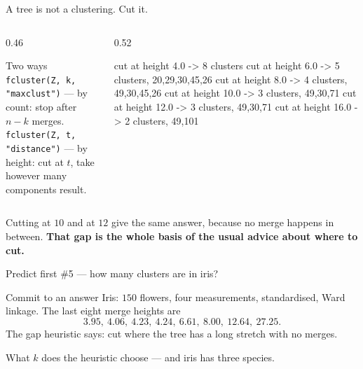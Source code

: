 \documentclass[aspectratio=169]{beamer}
\begin{document}
\begin{frame}[fragile,shrink=4]{A tree is not a clustering. Cut it.}
  \begin{columns}[T]
    \begin{column}{0.46\textwidth}
      \begin{block}{Two ways}
        \small
        \texttt{fcluster(Z, k, "maxclust")} --- by count: stop after $n-k$
        merges.\\[0.4em]
        \texttt{fcluster(Z, t, "distance")} --- by height: cut at $t$, take
        however many components result.
      \end{block}
    \end{column}
    \begin{column}{0.52\textwidth}
\begin{outblk}
  cut at height   4.0 -> 8 clusters
  cut at height   6.0 -> 5 clusters, 20,29,30,45,26
  cut at height   8.0 -> 4 clusters, 49,30,45,26
  cut at height  10.0 -> 3 clusters, 49,30,71
  cut at height  12.0 -> 3 clusters, 49,30,71
  cut at height  16.0 -> 2 clusters, 49,101
\end{outblk}
    \end{column}
  \end{columns}
  \vspace{0.3em}
  \begin{exampleblock}{}
    \centering
    Cutting at $10$ and at $12$ give the same answer, because no merge happens
    in between. \textbf{That gap is the whole basis of the usual advice about
    where to cut.}
  \end{exampleblock}
\end{frame}

\begin{frame}[shrink=9]{Predict first \#5 --- how many clusters are in iris?}
  \begin{alertblock}{Commit to an answer}
    Iris: $150$ flowers, four measurements, standardised, Ward linkage. The
    last eight merge heights are
    \[
      3.95,\ 4.06,\ 4.23,\ 4.24,\ 6.61,\ 8.00,\ 12.64,\ 27.25 .
    \]
    The gap heuristic says: cut where the tree has a long stretch with no
    merges.

    \medskip
    \centering\large
    What $k$ does the heuristic choose --- and iris has three species.
  \end{alertblock}
\end{frame}
\end{document}
